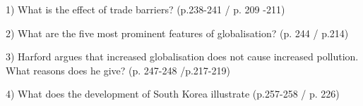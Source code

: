 1) What is the effect of trade barriers? (p.238-241 / p. 209 -211)

2) What are the five most prominent features of globalisation? (p. 244 / p.214)

3) Harford argues that increased globalisation does not cause increased pollution. What reasons does he 
give? (p. 247-248 /p.217-219)

4) What does the development of South Korea illustrate (p.257-258 / p. 226)